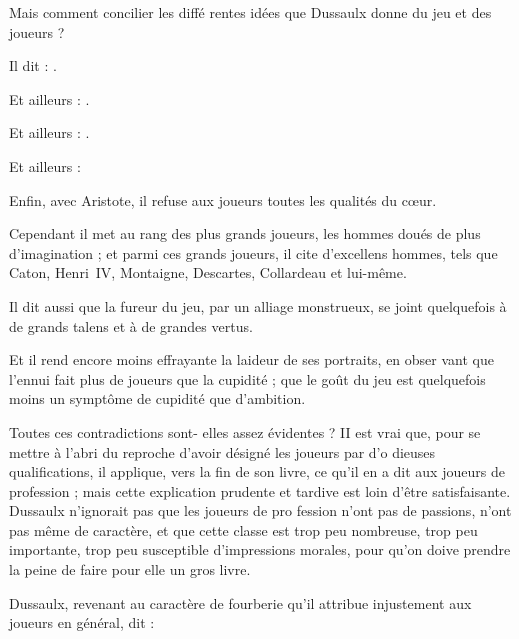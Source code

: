 Mais comment concilier les diffé%
rentes idées que Dussaulx donne du
jeu et des joueurs ?

Il dit : .

Et ailleurs : .

Et ailleurs : .

Et ailleurs : 

Enfin, avec Aristote, il refuse aux
joueurs toutes les qualités du cœur.

Cependant il met au rang des plus
grands joueurs, les hommes doués
de plus d'imagination ; et parmi ces
grands joueurs, il cite d'excellens
hommes, tels que Caton, Henri~IV,
Montaigne, Descartes, Collardeau et
lui-même.

Il dit aussi que la fureur du jeu,
par un alliage monstrueux, se joint
quelquefois à de grands talens et à
de grandes vertus.

Et il rend encore moins effrayante
la laideur de ses portraits, en obser%
vant que l'ennui fait plus de joueurs
que la cupidité ; que le goût du jeu
est quelquefois moins un symptôme
de cupidité que d'ambition.

Toutes ces contradictions sont-%
elles assez évidentes ? II est vrai que,
pour se mettre à l'abri du reproche
d'avoir désigné les joueurs par d'o%
dieuses qualifications, il applique,
vers la fin de son livre, ce qu'il en a
dit aux joueurs de profession ; mais
cette explication prudente et tardive
est loin d'être satisfaisante. Dussaulx
n'ignorait pas que les joueurs de pro%
fession n'ont pas de passions, n'ont
pas même de caractère, et que cette
classe est trop peu nombreuse, trop
peu importante, trop peu susceptible
d'impressions morales, pour qu'on
doive prendre la peine de faire pour
elle un gros livre.

Dussaulx, revenant au caractère de
fourberie qu'il attribue injustement
aux joueurs en général, dit : 

